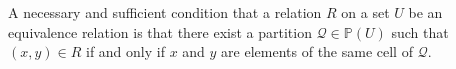 A necessary and sufficient condition that a relation $R$ on a set $U$ be an equivalence relation is that there exist a partition $\mathcal{Q} \in \mathbb{P}(U)$ such that $(x, y) \in R$ if and only if $x$ and $y$ are elements of the same cell of $\mathcal{Q}$.
